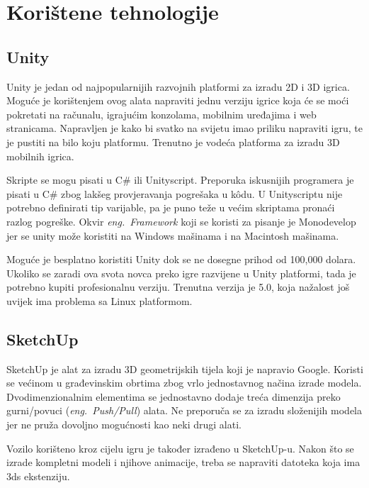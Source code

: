 \section{Korištene tehnologije}
\subsection{Unity}
Unity je jedan od najpopularnijih razvojnih platformi za izradu 2D i 3D igrica. Moguće je korištenjem ovog alata napraviti jednu verziju igrice koja će se moći pokretati na računalu, igrajućim konzolama, mobilnim uređajima i web stranicama. Napravljen je kako bi svatko na svijetu imao priliku napraviti igru, te je pustiti na bilo koju platformu. Trenutno je vodeća platforma za izradu 3D mobilnih igrica.

Skripte se mogu pisati u C\# ili Unityscript. Preporuka iskusnijih programera je pisati u C\# zbog lakšeg provjeravanja pogrešaka u k\^odu. U Unityscriptu nije potrebno definirati tip varijable, pa je puno teže u većim skriptama pronaći razlog pogreške. Okvir \emph{eng.~Framework} koji se koristi za pisanje je Monodevelop jer se unity može koristiti na Windows mašinama i na Macintosh mašinama. 

Moguće je besplatno koristiti Unity dok se ne dosegne prihod od 100,000 dolara. Ukoliko se zaradi ova svota novca preko igre razvijene u Unity platformi, tada je potrebno kupiti profesionalnu verziju. Trenutna verzija je 5.0, koja nažalost još uvijek ima problema sa Linux platformom.

\subsection{SketchUp}
SketchUp je alat za izradu 3D geometrijskih tijela koji je napravio Google. Koristi se većinom u građevinskim obrtima zbog vrlo jednostavnog načina izrade modela. Dvodimenzionalnim elementima se jednostavno dodaje treća dimenzija preko gurni/povuci (\emph{eng.~Push/Pull}) alata. Ne preporuča se za izradu složenijih modela jer ne pruža dovoljno mogućnosti kao neki drugi alati. 

Vozilo korišteno kroz cijelu igru je također izrađeno u SketchUp-u. Nakon što se izrade kompletni modeli i njihove animacije, treba se napraviti datoteka koja ima 3ds ekstenziju.

